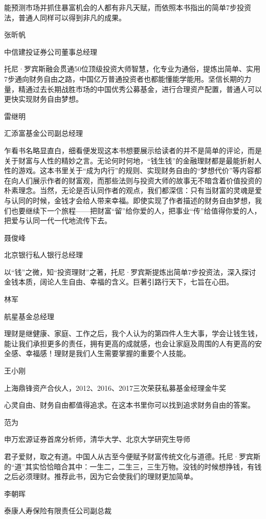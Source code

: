 

能预测市场并抓住暴富机会的人都有非凡天赋，而依照本书指出的简单7步投资法，普通人同样可以得到非凡的成果。

{\kaishu \hfill 张昕帆

\hfill 中信建投证券公司董事总经理
\vspace{1em}}

托尼·罗宾斯融会贯通50位顶级投资大师智慧，化专业为通俗，提炼出简单、实用7步通向财务自由之路，中国亿万普通投资者也都能懂能学能用。坚信长期的力量，精通过去长期战胜市场的中国优秀公募基金，进行合理资产配置，普通人可以更快实现财务自由梦想。

{\kaishu \hfill 雷继明

\hfill 汇添富基金公司副总经理
\vspace{1em}}

乍看书名略显直白，细看便发现这本书想要展示给读者的并不是简单的评论，而是关于财富与人性的精妙之言。无论何时何地，“钱生钱”的金融理财都是最能折射人性的游戏。这本书里关于“成为内行”的规则、实现财务自由的“梦想代价”等内容都在向人们展示作者的财富观，而那些法则与投资大师的故事无不暗含着价值投资的朴素理念。当然，无论是否认同作者的观点，我们都深信：只有当财富的灵魂是爱与认同的时候，金钱才会给人带来幸福。即使实现了作者描述的财务自由梦想，我们也要继续下一个旅程——把财富“留”给你爱的人，把事业“传”给值得你爱的人，把爱与认同一代一代地流传下去。

{\kaishu \hfill 聂俊峰

\hfill 北京银行私人银行总经理
\vspace{1em}}

以“钱”之微，知“投资理财”之著，托尼·罗宾斯提炼出简单7步投资法，深入探讨金钱本质，阔论人生自由、幸福的含义。巨著引路行天下，七旨在心田。

{\kaishu \hfill 林军

\hfill 航星基金总经理
\vspace{1em}}

理财是继健康、家庭、工作之后，我个人认为的第四件人生大事，学会让钱生钱，能让我们承担更多的责任，拥有更高的成就感，也会让家庭及周围的人有更高的安全感、幸福感！理财是我们人生需要掌握的重要个人技能。

{\kaishu \hfill 王小刚

\hfill 上海鼎锋资产合伙人，2012、2016、2017三次荣获私募基金经理金牛奖
\vspace{1em}}

心灵自由、财务自由都值得追求。在这本书里你可以找到追求财务自由的答案。

{\kaishu \hfill 范为

\hfill 申万宏源证券首席分析师，清华大学、北京大学研究生导师
\vspace{1em}}

君子爱财，取之有道。中国人从古至今便赋予财富传统文化与道德。托尼·罗宾斯的“道”其实恰恰暗合其中：一生二，二生三，三生万物。没钱的时候想挣钱，有钱之后必须理财。推荐此书，因为它会使我们的理财更加简单。

{\kaishu \hfill 李朝晖

\hfill 泰康人寿保险有限责任公司副总裁
\vspace{1em}}